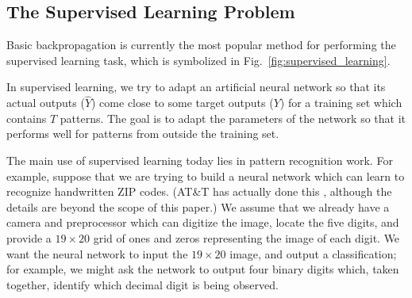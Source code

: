 \documentclass[journal]{IEEEtran} %
\begin{document}
\subsection{The Supervised Learning Problem}
Basic backpropagation is currently the most popular method for performing the supervised learning task, which is symbolized in Fig.~\ref{fig:supervised_learning}.

In supervised learning, we try to adapt an artificial neural network so that its actual outputs ($\hat{Y}$) come close to some target outputs ($Y$) for a training set which contains $T$ patterns. The goal is to adapt the parameters of the network so that it performs well for patterns from outside the training set.

The main use of supervised learning today lies in pattern recognition work. For example, suppose that we are trying to build a neural network which can learn to recognize handwritten ZIP codes. (AT\&T has actually done this \cite{Guyon:1989}, although the details are beyond the scope of this paper.) We assume that we already have a camera and preprocessor which can digitize the image, locate the five digits, and provide a $19 \times 20$ grid of ones and zeros representing the image of each digit. We want the neural network to input the $19 \times 20$ image, and output a classification; for example, we might ask the network to output four binary digits which, taken together, identify which decimal digit is being observed.
\end{document}
